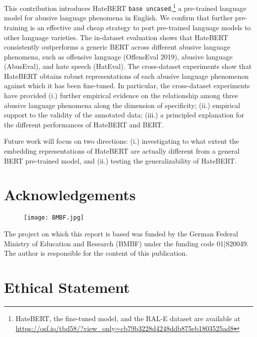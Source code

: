 \documentclass[11pt]{article}
\begin{document}
This contribution introduces HateBERT \texttt{base uncased},\footnote{HateBERT, the fine-tuned model, and the RAL-E dataset are available at \url{https://osf.io/tbd58/?view_only=cb79b3228d4248ddb875eb1803525ad8}} a pre-trained language model for abusive language phenomena in English. We confirm that further pre-training is an effective and cheap strategy to port pre-trained language models to other language varieties. The in-dataset evaluation shows that HateBERT consistently outperforms a generic BERT across different abusive language phenomena, such as offensive language (OffensEval 2019), abusive language (AbusEval), and hate speech (HatEval). The cross-dataset experiments show that HateBERT obtains robust representations of each abusive language phenomenon against which it has been fine-tuned. In particular, the cross-dataset experiments have provided (i.) further empirical evidence on the relationship among three abusive language phenomena along the dimension of specificity; (ii.) empirical support to the validity of the annotated data; (iii.) a principled explanation for the different performances of HateBERT and BERT.


Future work will focus on two directions: (i.) investigating to what extent the embedding representations of HateBERT are actually different from a general BERT pre-trained model, and (ii.) testing the generalizability of HateBERT.

\section*{Acknowledgements}
\begin{figure}[htbp]
   \texttt{[image: BMBF.jpg]}
    \label{fig:leximirka}
\end{figure}
The project on which this report is based was funded by the German Federal Ministry of Education and Research (BMBF) under the funding code 01|S20049. The author is responsible for the content of this publication.

\newpage

\section*{Ethical Statement}
\end{document}
